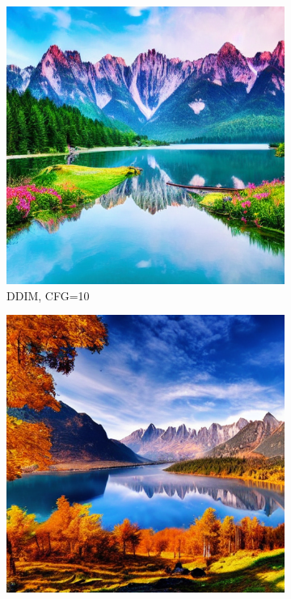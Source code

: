 \documentclass[10pt,twocolumn]{article}
\begin{document}
\begin{figure}[H]
    \centering
    \begin{subfigure}{0.32\textwidth}
        \includegraphics[width=\linewidth]{figures/baseline_ddim_cfg10.0_512_prompt1_20250712_092300.png}
        \caption{DDIM, CFG=10}
    \end{subfigure}
    \begin{subfigure}{0.32\textwidth}
        \includegraphics[width=\linewidth]{figures/baseline_dpm++_2m_cfg10.0_512_prompt1_20250712_094232.png}

\end{subfigure}
\end{figure}
\end{document}

